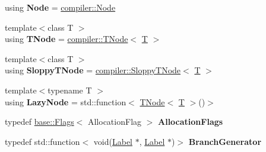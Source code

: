 \begin{DoxyCompactItemize}
using {\bfseries Node} = \mbox{\hyperlink{classv8_1_1internal_1_1compiler_1_1Node}{compiler\+::\+Node}}
\item 
\mbox{\label{classv8_1_1internal_1_1CodeStubAssembler_a184128015d9c9421f94fde17c084da9a}} 
{\footnotesize template$<$class T $>$ }\\using {\bfseries T\+Node} = \mbox{\hyperlink{classv8_1_1internal_1_1compiler_1_1TNode}{compiler\+::\+T\+Node}}$<$ \mbox{\hyperlink{classv8_1_1internal_1_1torque_1_1T}{T}} $>$
\item 
\mbox{\label{classv8_1_1internal_1_1CodeStubAssembler_a947a09632490226b51cade9fd3a19d02}} 
{\footnotesize template$<$class T $>$ }\\using {\bfseries Sloppy\+T\+Node} = \mbox{\hyperlink{classv8_1_1internal_1_1compiler_1_1SloppyTNode}{compiler\+::\+Sloppy\+T\+Node}}$<$ \mbox{\hyperlink{classv8_1_1internal_1_1torque_1_1T}{T}} $>$
\item 
\mbox{\label{classv8_1_1internal_1_1CodeStubAssembler_a97b314d6b830c315bd5f536c710f2797}} 
{\footnotesize template$<$typename T $>$ }\\using {\bfseries Lazy\+Node} = std\+::function$<$ \mbox{\hyperlink{classv8_1_1internal_1_1compiler_1_1TNode}{T\+Node}}$<$ \mbox{\hyperlink{classv8_1_1internal_1_1torque_1_1T}{T}} $>$()$>$
\item 
\mbox{\label{classv8_1_1internal_1_1CodeStubAssembler_a694827ac4fd700f3ec59869a32b75a47}} 
typedef \mbox{\hyperlink{classv8_1_1base_1_1Flags}{base\+::\+Flags}}$<$ Allocation\+Flag $>$ {\bfseries Allocation\+Flags}
\item 
\mbox{\label{classv8_1_1internal_1_1CodeStubAssembler_ab9e6773e548d8f38ed6cc661e810e5ca}} 
typedef std\+::function$<$ void(\mbox{\hyperlink{classv8_1_1internal_1_1compiler_1_1CodeAssemblerLabel}{Label}} $\ast$, \mbox{\hyperlink{classv8_1_1internal_1_1compiler_1_1CodeAssemblerLabel}{Label}} $\ast$)$>$ {\bfseries Branch\+Generator}
\item 
\mbox{\label{classv8_1_1internal_1_1CodeStubAssembler_a6ccbf95354ef44105651eb19b5ebc489}} 

\end{DoxyCompactItemize}
